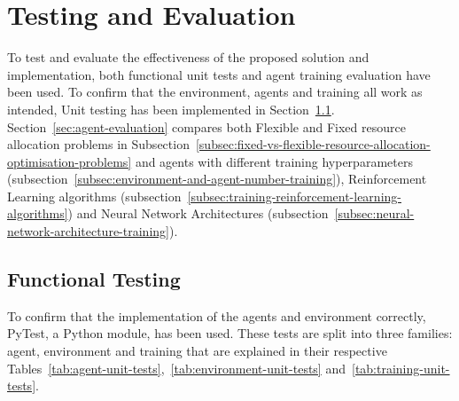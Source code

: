 
\chapter{Testing and Evaluation}
\label{ch:testing-and-evaluation}
To test and evaluate the effectiveness of the proposed solution and implementation, both functional unit tests and
agent training evaluation have been used. To confirm that the environment, agents and training all work as intended,
Unit testing has been implemented in Section~\ref{sec:functional-testing}.\\
Section~\ref{sec:agent-evaluation} compares both Flexible and Fixed resource allocation problems in
Subsection~\ref{subsec:fixed-vs-flexible-resource-allocation-optimisation-problems} and agents with
different training hyperparameters (subsection~\ref{subsec:environment-and-agent-number-training}), Reinforcement
Learning algorithms (subsection~\ref{subsec:training-reinforcement-learning-algorithms}) and Neural Network
Architectures (subsection~\ref{subsec:neural-network-architecture-training}).

\section{Functional Testing}
\label{sec:functional-testing}
To confirm that the implementation of the agents and environment correctly, PyTest, a Python module, has been used. These
tests are split into three families: agent, environment and training that are
explained in their respective Tables~\ref{tab:agent-unit-tests},~\ref{tab:environment-unit-tests}
and~\ref{tab:training-unit-tests}.

